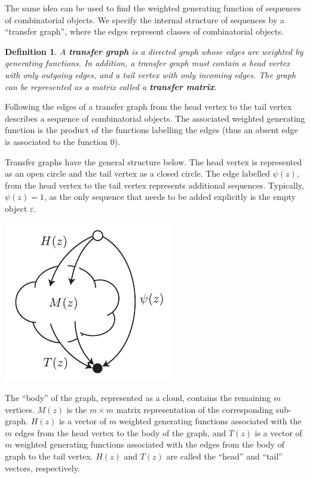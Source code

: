 \documentclass{article}
\newtheorem{definition}{Definition}
\newenvironment{inset}
{\vspace{0.5\baselineskip}\begin{center}}
{\end{center}\vspace{0.5\baselineskip}}
\begin{document}
The same idea can be used to find the weighted generating function of
sequences of combinatorial objects. We specify the internal structure of
sequences by a ``transfer graph'', where the edges represent classes of
combinatorial objects.

\begin{definition}
\label{def:transfermat}
A \textbf{transfer graph} is a directed graph whose edges are weighted by
generating functions. In addition, a transfer graph must contain a head
vertex with only outgoing edges, and a tail vertex with only incoming
edges. The graph can be represented as a matrix called a \textbf{transfer
matrix}.
\end{definition}

Following the edges of a transfer graph from the head vertex to the tail
vertex describes a sequence of combinatorial objects. The associated
weighted generating function is the product of the functions labelling the
edges (thus an absent edge is associated to the function $0$).

Transfer graphs have the general structure below. The head vertex is
represented as an open circle and the tail vertex as a closed circle. The
edge labelled $\psi(z)$, from the head vertex to the tail vertex
represents additional sequences. Typically, $\psi(z) = 1$, as the only
sequence that needs to be added explicitly is the empty object
$\varepsilon$.

\begin{inset}
\includegraphics[scale=1.0]{cloud.pdf}
\end{inset}

The ``body'' of the graph, represented as a cloud, contains the remaining
$m$ vertices. $M(z)$ is the $m \times m$ matrix representation of the
corresponding sub-graph. $H(z)$ is a vector of $m$ weighted generating
functions associated with the $m$ edges from the head vertex to the body
of the graph, and $T(z)$ is a vector of $m$ weighted generating functions
associated with the edges from the body of graph to the tail vertex.
$H(z)$ and $T(z)$ are called the ``head'' and ``tail'' vectors,
respectively.
\end{document}
